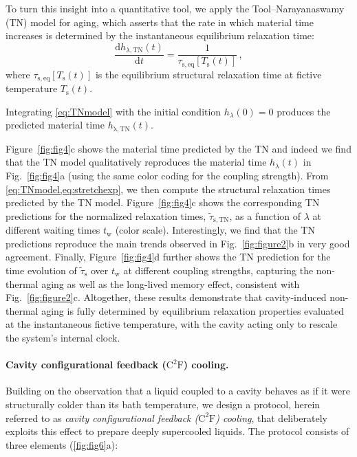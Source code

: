 \documentclass[aps, prl,
 reprint,
 superscriptaddress,
 citeautoscript,  %
 amsmath,amssymb,
 tightenlines
]{revtex4-2}
\begin{document}
To turn this insight into a quantitative tool, we apply the Tool--Narayanaswamy (TN) model for aging,\cite{Tool1946,Narayanaswamy1971} which asserts that the rate in which material time increases is determined by the instantaneous equilibrium relaxation time:
\begin{equation}
    \frac{\mathrm{d} h_{\lambda,\mathrm{TN}}(t)}{\mathrm{d} t}  = \frac{1}{\tau_\mathrm{s,\mathrm{eq}}[T_\mathrm{s}(t)]} \,, \label{eq:TNmodel}
\end{equation}
where $\tau_\mathrm{s,\mathrm{eq}}[T_\mathrm{s}(t)]$ is the equilibrium structural relaxation time at fictive temperature $T_\mathrm{s}(t)$.

Integrating \cref{eq:TNmodel} with the initial condition $h_\lambda(0) = 0$ produces the predicted material time $h_{\mathrm{\lambda,TN}}(t)$. 





Figure~\ref{fig:fig4}c shows the material time predicted by the TN and indeed we find that the TN model qualitatively reproduces the material time $h_\lambda(t)$ in Fig.~\ref{fig:fig4}a (using the same color coding for the coupling strength). From \cref{eq:TNmodel,eq:stretchexp}, we then compute the structural relaxation times predicted by the TN model. Figure~\ref{fig:fig4}c shows the corresponding TN predictions for the normalized relaxation times, $\tilde{\tau}_{\mathrm{s,TN}}$, as a function of $\lambda$ at different waiting times $t_\mathrm{w}$ (color scale). Interestingly, we find that the TN predictions reproduce the main trends observed in Fig.~\ref{fig:figure2}b in very good agreement. Finally, Figure~\ref{fig:fig4}d further shows the TN prediction for the time evolution of $\tilde{\tau}_\mathrm{s}$ over $t_\mathrm{w}$ at different coupling strengths, capturing the non-thermal aging as well as the long-lived memory effect, consistent with Fig.~\ref{fig:figure2}c. Altogether, these results demonstrate that cavity-induced non-thermal aging is fully determined by equilibrium relaxation properties evaluated at the instantaneous fictive temperature, with the cavity acting only to rescale the system’s internal clock.

\paragraph*{Cavity configurational feedback ($\mathrm{C^2 F}$) cooling.} 
Building on the observation that a liquid coupled to a cavity behaves as if it were structurally colder than its bath temperature, we design a protocol, herein referred to as \textit{cavity configurational feedback ($\mathrm{C^2F}$) cooling}, that deliberately exploits this effect to prepare deeply supercooled liquids. The protocol consists of three elements (\cref{fig:fig6}a):
\end{document}
